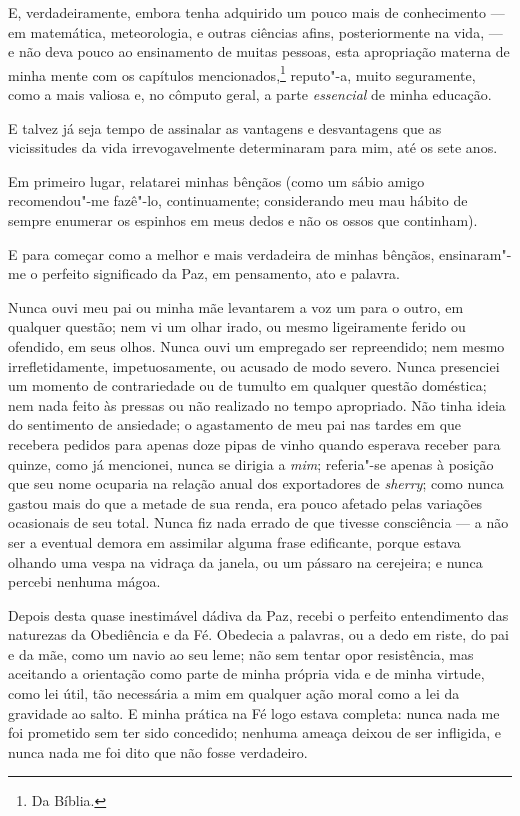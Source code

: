 \medskip

\noindent{}E, verdadeiramente, embora tenha adquirido um pouco mais de conhecimento
--- em matemática, meteorologia, e outras ciências afins, posteriormente
na vida, --- e não deva pouco ao ensinamento de muitas pessoas, esta
apropriação materna de minha mente com os capítulos mencionados,\footnote{Da
Bíblia.} reputo"-a, muito seguramente, como a mais valiosa e, no
cômputo geral, a parte \textit{essencial} de minha educação.

E talvez já seja tempo de assinalar as vantagens e desvantagens que as
vicissitudes da vida irrevogavelmente determinaram para mim, até os sete
anos.

Em primeiro lugar, relatarei minhas bênçãos (como um sábio amigo
recomendou"-me fazê"-lo, continuamente; considerando meu mau hábito de
sempre enumerar os espinhos em meus dedos e não os ossos que continham).

E para começar como a melhor e mais verdadeira de minhas bênçãos,
ensinaram"-me o perfeito significado da Paz, em pensamento, ato e
palavra.

Nunca ouvi meu pai ou minha mãe levantarem a voz um para o outro, em
qualquer questão; nem vi um olhar irado, ou mesmo ligeiramente ferido ou
ofendido, em seus olhos. Nunca ouvi um empregado ser repreendido; nem
mesmo irrefletidamente, impetuosamente, ou acusado de modo severo. Nunca
presenciei um momento de contrariedade ou de tumulto em qualquer questão
doméstica; nem nada feito às pressas ou não realizado no tempo
apropriado. Não tinha ideia do sentimento de ansiedade; o agastamento de
meu pai nas tardes em que recebera pedidos para apenas doze pipas de
vinho quando esperava receber para quinze, como já mencionei, nunca se
dirigia a \textit{mim}; referia"-se apenas à posição que seu nome ocuparia
na relação anual dos exportadores de \textit{sherry}; como nunca gastou mais do
que a metade de sua renda, era pouco afetado pelas variações ocasionais
de seu total. Nunca fiz nada errado de que tivesse consciência --- a não
ser a eventual demora em assimilar alguma frase edificante, porque
estava olhando uma vespa na vidraça da janela, ou um pássaro na
cerejeira; e nunca percebi nenhuma mágoa.

Depois desta quase inestimável dádiva da Paz, recebi o perfeito
entendimento das naturezas da Obediência e da Fé. Obedecia a palavras,
ou a dedo em riste, do pai e da mãe, como um navio ao seu leme; não sem
tentar opor resistência, mas aceitando a orientação como parte de minha
própria vida e de minha virtude, como lei útil, tão necessária a mim em
qualquer ação moral como a lei da gravidade ao salto. E minha prática na
Fé logo estava completa: nunca nada me foi prometido sem ter sido
concedido; nenhuma ameaça deixou de ser infligida, e nunca nada me foi
dito que não fosse verdadeiro.

